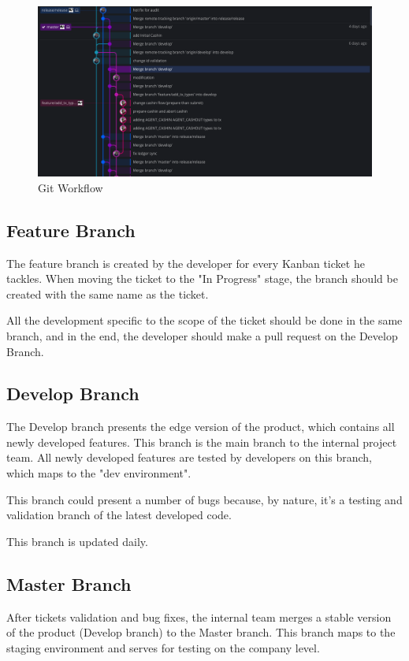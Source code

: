 \begin{spacing}{1.2}
\begin{figure}[!ht]\centering
\includegraphics[scale=0.4]{git_workflow.png}
\caption{Git Workflow}
\label{fig:git}
\end{figure}

\subsection{Feature Branch}
The feature branch is created by the developer for every Kanban ticket he tackles. When moving the ticket to the "In Progress" stage, the branch should be created with the same name as the ticket.

All the development specific to the scope of the ticket should be done in the same branch, and in the end, the developer should make a pull request on the Develop Branch.
\subsection{Develop Branch}
The Develop branch presents the edge version of the product, which contains all newly developed features. This branch is the main branch to the internal project team. All newly developed features are tested by developers on this branch, which maps to the "dev environment".

This branch could present a number of bugs because, by nature, it's a testing and validation branch of the latest developed code.

This branch is updated daily.
\subsection{Master Branch}
After tickets validation and bug fixes, the internal team merges a stable version of the product (Develop branch) to the Master branch. This branch maps to the staging environment and serves for testing on the company level.


\end{spacing}
